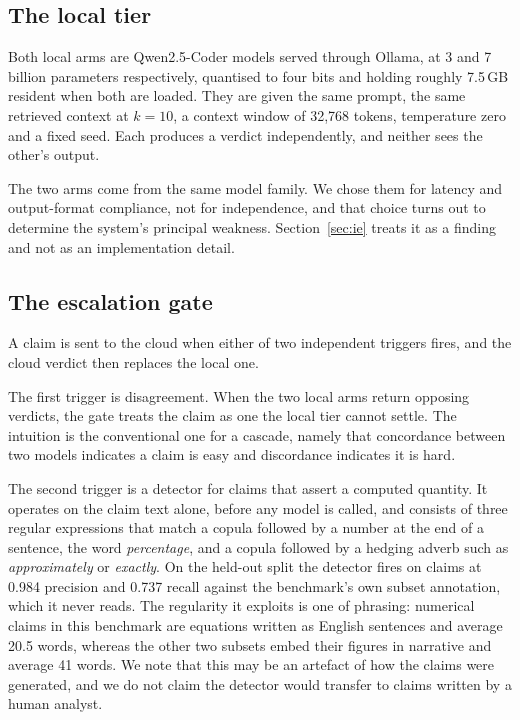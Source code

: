 \documentclass{article}
\begin{document}
\subsection{The local tier}
\label{sec:local}

Both local arms are Qwen2.5-Coder models served through Ollama, at 3 and 7 billion
parameters respectively, quantised to four bits and holding roughly 7.5\,GB resident when
both are loaded. They are given the same prompt, the same retrieved context at $k{=}10$, a
context window of 32,768 tokens, temperature zero and a fixed seed. Each produces a verdict
independently, and neither sees the other's output.

The two arms come from the same model family. We chose them for latency and output-format
compliance, not for independence, and that choice turns out to determine the system's
principal weakness. Section~\ref{sec:ie} treats it as a finding and not as an implementation
detail.

\subsection{The escalation gate}
\label{sec:gate}

A claim is sent to the cloud when either of two independent triggers fires, and the cloud
verdict then replaces the local one.

The first trigger is disagreement. When the two local arms return opposing verdicts, the
gate treats the claim as one the local tier cannot settle. The intuition is the
conventional one for a cascade, namely that concordance between two models indicates a
claim is easy and discordance indicates it is hard.

The second trigger is a detector for claims that assert a computed quantity. It operates
on the claim text alone, before any model is called, and consists of three regular
expressions that match a copula followed by a number at the end of a sentence, the word
\emph{percentage}, and a copula followed by a hedging adverb such as \emph{approximately}
or \emph{exactly}. On the held-out split the detector fires on \trigNumericN{} claims at
0.984 precision and 0.737 recall against the benchmark's own subset annotation, which it
never reads. The regularity it exploits is one of phrasing: numerical claims in this
benchmark are equations written as English sentences and average 20.5 words, whereas the
other two subsets embed their figures in narrative and average 41 words. We note that this
may be an artefact of how the claims were generated, and we do not claim the detector
would transfer to claims written by a human analyst.
\end{document}
